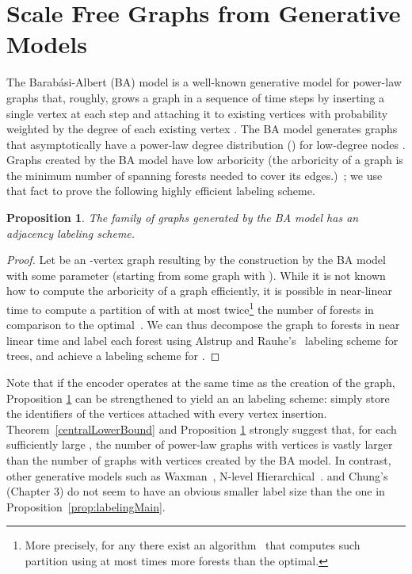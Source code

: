 \documentclass{article}
\newtheorem{proposition}{Proposition}
\theoremstyle{remark}
\begin{document}
\section{Scale Free  Graphs from Generative Models}\label{Sec:ScaleFree}
The Barab{\'a}si-Albert (BA) model is a well-known generative model for power-law graphs that, roughly, grows a graph in a sequence of time steps by
inserting a single vertex at each step and attaching it to  existing vertices with probability weighted by the degree of each existing vertex \cite{barabasi1999emergence}. The BA model
generates graphs that asymptotically have a power-law degree distribution () for low-degree nodes \cite{DBLP:journals/rsa/BollobasRST01}.
Graphs created by the BA model have low arboricity (the arboricity of a graph is the minimum number of spanning forests needed to cover its edges.)~\cite{goel2006bounded}; we use
that fact to prove the following highly efficient labeling scheme. 




\begin{proposition}\label{Th:baLabeling}
The family of graphs generated by the BA model has an  adjacency labeling scheme.
\end{proposition}

\begin{proof}
Let    be an -vertex graph resulting by the construction  by the BA model with some parameter  (starting from some graph  with ).
While it is not known how to compute the   arboricity of a graph efficiently, it is possible in near-linear time to compute a partition of  with  at most twice\footnote{More precisely, for any   there exist an  algorithm~\cite{kowalik2006approximation} that computes such partition using at most  times more forests than the optimal.} the number of forests in comparison to the optimal~\cite{arikati1997efficient}.
We can thus decompose the graph to  forests in near linear time and label each forest using Alstrup and Rauhe's~\cite{Alstrup02}  labeling scheme for trees,  and achieve a  labeling scheme for .
\end{proof}

Note that if the encoder operates at the same time as the creation of the graph, Proposition \ref{Th:baLabeling} can be strengthened to yield an an  labeling scheme: simply store the  
 identifiers of the  vertices attached with every vertex insertion.
Theorem~\ref{centralLowerBound} and Proposition \ref{Th:baLabeling} strongly suggest that, for each sufficiently large , the number of  power-law graphs with  vertices  is vastly larger than the number of graphs with  vertices created by the  BA model.  In contrast, other generative models such as   Waxman~\cite{waxman1988routing}, N-level Hierarchical~\cite{calvert1997modeling}.
and Chung's~\cite{chung2006complex} (Chapter 3)  do not seem to have an obvious smaller label size than the one in Proposition~\ref{prop:labelingMain}.
\end{document}
